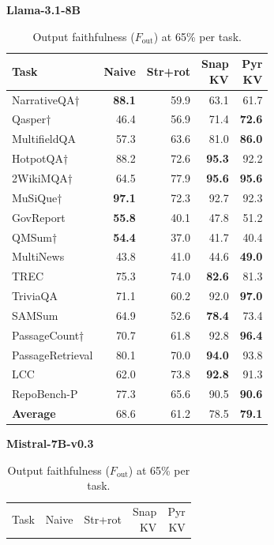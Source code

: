 \documentclass[10pt,letterpaper]{article}
\begin{document}
\begin{table}[H]
\centering
\small
\captionsetup{justification=centering}
\caption{Output faithfulness (\(F_{\text{out}}\)) at 65\% per task.}
\label{tab:fout55-llama}
\begin{minipage}[t]{0.49\textwidth}
\centering
\textbf{Llama-3.1-8B}\\[0.4em]
\begin{tabular}{@{}lrrrr@{}}
\toprule
Task & Naive & Str+rot & \makecell{Snap\\KV} & \makecell{Pyr\\KV}\\
\midrule
NarrativeQA† & \textbf{88.1} & 59.9 & 63.1 & 61.7\\
Qasper† & 46.4 & 56.9 & 71.4 & \textbf{72.6}\\
MultifieldQA & 57.3 & 63.6 & 81.0 & \textbf{86.0}\\
HotpotQA† & 88.2 & 72.6 & \textbf{95.3} & 92.2\\
2WikiMQA† & 64.5 & 77.9 & \textbf{95.6} & \textbf{95.6}\\
MuSiQue† & \textbf{97.1} & 72.3 & 92.7 & 92.3\\
GovReport & \textbf{55.8} & 40.1 & 47.8 & 51.2\\
QMSum† & \textbf{54.4} & 37.0 & 41.7 & 40.4\\
MultiNews & 43.8 & 41.0 & 44.6 & \textbf{49.0}\\
TREC & 75.3 & 74.0 & \textbf{82.6} & 81.3\\
TriviaQA & 71.1 & 60.2 & 92.0 & \textbf{97.0}\\
SAMSum & 64.9 & 52.6 & \textbf{78.4} & 73.4\\
PassageCount† & 70.7 & 61.8 & 92.8 & \textbf{96.4}\\
PassageRetrieval & 80.1 & 70.0 & \textbf{94.0} & 93.8\\
LCC & 62.0 & 73.8 & \textbf{92.8} & 91.3\\
RepoBench-P & 77.3 & 65.6 & 90.5 & \textbf{90.6}\\
\midrule
\textbf{Average} & 68.6 & 61.2 & 78.5 & \textbf{79.1}\\
\bottomrule
\end{tabular}
\end{minipage}%
\hfill
\begin{minipage}[t]{0.49\textwidth}
\centering
\textbf{Mistral-7B-v0.3}\\[0.4em]
\begin{tabular}{@{}lrrrr@{}}
\toprule
Task & Naive & Str+rot & \makecell{Snap\\KV} & \makecell{Pyr\\KV}\\

\end{tabular}
\end{minipage}
\end{table}
\end{document}
